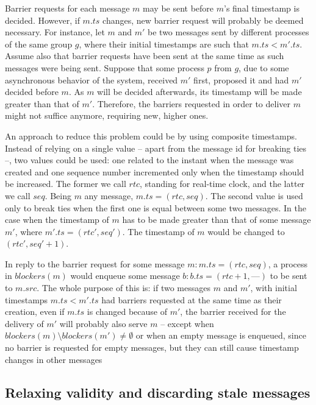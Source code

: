 \documentclass[times, 10pt]{article}
\begin{document}
Barrier requests for each message $m$ may be sent before $m$'s final timestamp is decided. However, if $m.ts$ changes, new barrier request will probably be deemed necessary. For instance, let $m$ and $m'$ be two messages sent by different processes of the same group $g$, where their initial timestamps are such that $m.ts < m'.ts$. Assume also that barrier requests have been sent at the same time as such messages were being sent. Suppose that some process $p$ from $g$, due to some asynchronous behavior of the system, received $m'$ first, proposed it and had $m'$ decided before $m$. As $m$ will be decided afterwards, its timestamp will be made greater than that of $m'$. Therefore, the barriers requested in order to deliver $m$ might not suffice anymore, requiring new, higher ones.

An approach to reduce this problem could be by using composite timestamps. Instead of relying on a single value -- apart from the message id for breaking ties --, two values could be used: one related to the instant when the message was created and one sequence number incremented only when the timestamp should be increased. The former we call $rtc$, standing for real-time clock, and the latter we call $seq$. Being $m$ any message, $m.ts = (rtc,seq)$. The second value is used only to break ties when the first one is equal between some two messages. In the case when the timestamp of $m$ has to be made greater than that of some message $m'$, where $m'.ts = (rtc', seq')$. The timestamp of $m$ would be changed to $(rtc', seq'+1)$.

In reply to the barrier request for some message $m : m.ts = (rtc,seq)$, a process in $blockers(m)$ would enqueue some message $b : b.ts = (rtc + 1, \text{---})$ to be sent to $m.src$. The whole purpose of this is: if two messages $m$ and $m'$, with initial timestamps $m.ts < m'.ts$ had barriers requested at the same time as their creation, even if $m.ts$ is changed because of $m'$, the barrier received for the delivery of $m'$ will probably also serve $m$ -- except when \mbox{$blockers(m) \setminus blockers(m') \neq \emptyset$} or when an empty message is enqueued, since no barrier is requested for empty messages, but they can still cause timestamp changes in other messages

\subsection{Relaxing validity and discarding stale messages}
\label{sec:discard}
\end{document}
